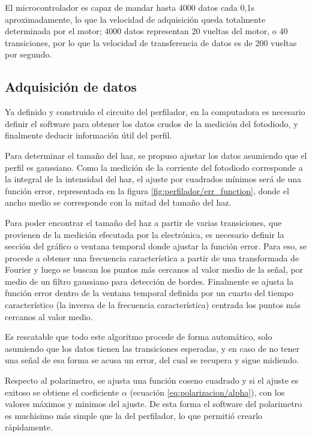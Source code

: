 El microcontrolador es capaz de mandar hasta 4000 datos cada 0,1s aproximadamente, lo que la velocidad de adquisición queda totalmente determinada por el motor; 4000 datos representan 20 vueltas del motor, o 40 transiciones, por lo que la velocidad de transferencia de datos es de 200 vueltas por segundo.

\subsection{Adquisición de datos}

Ya definido y construido el circuito del perfilador, en la computadora es necesario definir el software para obtener los datos crudos de la medición del fotodiodo, y finalmente deducir información útil del perfil. 

Para determinar el tamaño del haz, se propuso ajustar los datos asumiendo que el perfil es gaussiano. Como la medición de la corriente del fotodiodo corresponde a la integral de la intensidad del haz, el ajuste por cuadrados mínimos será de una función error, representada en la figura \ref{fig:perfilador/err_function}, donde el ancho medio se corresponde con la mitad del tamaño del haz.

Para poder encontrar el tamaño del haz a partir de varias transiciones, que provienen de la medición efecutada por la electrónica, es necesario definir la sección del gráfico o ventana temporal donde ajustar la función error. Para eso, se procede a obtener una frecuencia característica a partir de una transformada de Fourier y luego se buscan los puntos más cercanos al valor medio de la señal, por medio de un filtro gaussiano para detección de bordes. Finalmente se ajusta la función error dentro de la ventana temporal definida por un cuarto del tiempo característico (la inversa de la frecuencia característica) centrada los puntos más cercanos al valor medio. 

Es rescatable que todo este algoritmo procede de forma automático, solo asumiendo que los datos tienen las transiciones esperadas, y en caso de no tener una señal de esa forma se acusa un error, del cual se recupera y sigue midiendo.

Respecto al polarimetro, se ajusta una función coseno cuadrado y si el ajuste es exitoso se obtiene el coeficiente $\alpha$ (ecuación \ref{eq:polarizacion/alpha}), con los valores máximos y minimos del ajuste. De esta forma el software del polarimetro es muchisimo más simple que la del perfilador, lo que permitió crearlo rápidamente.

